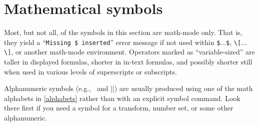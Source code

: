 \section{Mathematical symbols}
\label{math-symbols}


Most, but not all, of the symbols in this section are math-mode only.
That is, they yield a ``\texttt{Missing~\$ inserted}'' error message if not
used within \verb|$|$\ldots$\verb|$|, \verb|\[|$\ldots$\verb|\]|, or
another math-mode environment.  Operators marked as ``variable-sized''
are taller in displayed formulas, shorter in in-text formulas, and
possibly shorter still when used in various levels of superscripts or
subscripts.


\newcommand{\dotcup}{\ensuremath{\mathaccent\cdot\cup}}


Alphanumeric symbols (e.g., \!\, and
||) are usually produced using one of the math
alphabets in \ref{alphabets} rather than with an explicit symbol
command.  Look there first if you need a symbol for a transform,
number set, or some other alphanumeric.

